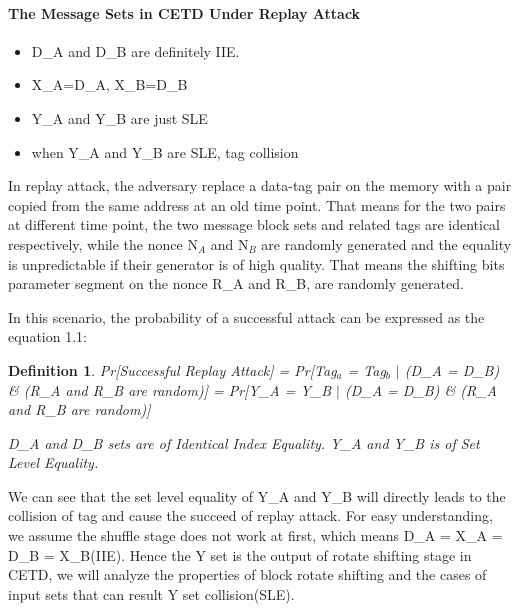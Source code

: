\documentclass{article}
\newtheorem{defination}{Definition}[section]
\begin{document}
\paragraph{The Message Sets in CETD Under Replay Attack}
\begin{itemize}
	\item D\_A and D\_B are definitely IIE.
	\item X\_A=D\_A, X\_B=D\_B
	\item Y\_A and Y\_B are just SLE
	\item when Y\_A and Y\_B are SLE, tag collision
\end{itemize}
In replay attack, the adversary replace a data-tag pair on the memory with a
pair copied from the same address at an old time point. That means for the two
pairs at different time point, the two message block sets and related tags are
identical respectively, while the nonce N$_A$ and N$_B$ are randomly generated and
the equality is unpredictable if their generator is of high quality.  That means
the shifting bits parameter segment on the nonce R\_A and R\_B, are randomly
generated.

In this scenario, the probability of a successful attack can be expressed as the equation 1.1:
\begin{defination}
Pr[Successful Replay Attack] = Pr[Tag$_a$ = Tag$_b$ $\mid$ (D\_A = D\_B) \& (R\_A and R\_B are random)]
							 = Pr[Y\_A = Y\_B $\mid$ (D\_A = D\_B) \& (R\_A and R\_B are random)]
							 
D\_A and D\_B sets are of Identical Index Equality. Y\_A and Y\_B is of Set Level Equality.
\end{defination} 

We can see that the set level equality of Y\_A and Y\_B will directly leads to the collision of tag and cause the succeed of replay attack. 
For easy understanding, we assume the shuffle stage does not work at first, which means D\_A = X\_A = D\_B = X\_B(IIE). Hence the Y set is the output of rotate shifting stage in CETD, we will analyze the properties of block rotate shifting and the cases of input sets that can result Y set collision(SLE). 
\end{document}
